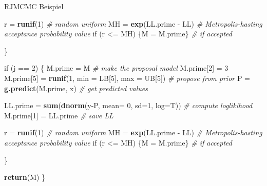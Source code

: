\documentclass[ignorenonframetext,]{beamer}
\newenvironment{Shaded}{\begin{snugshade}}{\end{snugshade}}
\newcommand{\KeywordTok}[1]{\textcolor[rgb]{0.13,0.29,0.53}{\textbf{{#1}}}}
\newcommand{\DataTypeTok}[1]{\textcolor[rgb]{0.13,0.29,0.53}{{#1}}}
\newcommand{\DecValTok}[1]{\textcolor[rgb]{0.00,0.00,0.81}{{#1}}}
\newcommand{\StringTok}[1]{\textcolor[rgb]{0.31,0.60,0.02}{{#1}}}
\newcommand{\CommentTok}[1]{\textcolor[rgb]{0.56,0.35,0.01}{\textit{{#1}}}}
\newcommand{\NormalTok}[1]{{#1}}
\begin{document}
\begin{frame}{RJMCMC Beispiel}
\begin{Shaded}
\begin{Highlighting}[]
\NormalTok{r =}\StringTok{ }\KeywordTok{runif}\NormalTok{(}\DecValTok{1}\NormalTok{)                                          }\CommentTok{# random uniform}
\NormalTok{MH =}\StringTok{ }\KeywordTok{exp}\NormalTok{(LL.prime -}\StringTok{ }\NormalTok{LL)                               }\CommentTok{# Metropolis-hasting acceptance probability value}
\NormalTok{if (r <=}\StringTok{ }\NormalTok{MH) \{M =}\StringTok{ }\NormalTok{M.prime\}                            }\CommentTok{# if accepted}

\NormalTok{\}}

\NormalTok{if (j ==}\StringTok{ }\DecValTok{2}\NormalTok{)}
\NormalTok{\{}
\NormalTok{M.prime =}\StringTok{ }\NormalTok{M                                           }\CommentTok{# make the proposal model}
\NormalTok{M.prime[}\DecValTok{2}\NormalTok{] =}\StringTok{ }\DecValTok{3}
\NormalTok{M.prime[}\DecValTok{5}\NormalTok{] =}\StringTok{ }\KeywordTok{runif}\NormalTok{(}\DecValTok{1}\NormalTok{, }\DataTypeTok{min =} \NormalTok{LB[}\DecValTok{5}\NormalTok{], }\DataTypeTok{max =} \NormalTok{UB[}\DecValTok{5}\NormalTok{])       }\CommentTok{# propose from prior}
\NormalTok{P =}\StringTok{ }\KeywordTok{g.predict}\NormalTok{(M.prime, x)                             }\CommentTok{# get predicted values}

\NormalTok{LL.prime =}\StringTok{ }\KeywordTok{sum}\NormalTok{(}\KeywordTok{dnorm}\NormalTok{(y-P, }\DataTypeTok{mean=} \DecValTok{0}\NormalTok{, }\DataTypeTok{sd=}\DecValTok{1}\NormalTok{, }\DataTypeTok{log=}\NormalTok{T))      }\CommentTok{# compute loglikihood}
\NormalTok{M.prime[}\DecValTok{1}\NormalTok{] =}\StringTok{ }\NormalTok{LL.prime                                 }\CommentTok{# save LL}

\NormalTok{r =}\StringTok{ }\KeywordTok{runif}\NormalTok{(}\DecValTok{1}\NormalTok{)                                          }\CommentTok{# random uniform}
\NormalTok{MH =}\StringTok{ }\KeywordTok{exp}\NormalTok{(LL.prime -}\StringTok{ }\NormalTok{LL)                               }\CommentTok{# Metropolis-hasting acceptance probability value}
\NormalTok{if (r <=}\StringTok{ }\NormalTok{MH) \{M =}\StringTok{ }\NormalTok{M.prime\}                            }\CommentTok{# if accepted}

\NormalTok{\}}

\KeywordTok{return}\NormalTok{(M)}
\NormalTok{\}}
\end{Highlighting}
\end{Shaded}


\end{frame}
\end{document}
